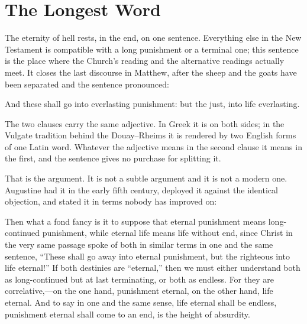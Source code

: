\section{The Longest Word}

The eternity of hell rests, in the end, on one sentence. Everything else in the New Testament is compatible with a long punishment or a terminal one; this sentence is the place where the Church's reading and the alternative readings actually meet. It closes the last discourse in Matthew, after the sheep and the goats have been separated and the sentence pronounced:

\begin{studyframe}
And these shall go into everlasting punishment: but the just, into life everlasting.
\end{studyframe}

The two clauses carry the same adjective. In Greek it is  on both sides; in the Vulgate tradition behind the Douay--Rheims it is rendered by two English forms of one Latin word. Whatever the adjective means in the second clause it means in the first, and the sentence gives no purchase for splitting it.

That is the argument. It is not a subtle argument and it is not a modern one. Augustine had it in the early fifth century, deployed it against the identical objection, and stated it in terms nobody has improved on:

\begin{studyframe}
Then what a fond fancy is it to suppose that eternal punishment means long-continued punishment, while eternal life means life without end, since Christ in the very same passage spoke of both in similar terms in one and the same sentence, ``These shall go away into eternal punishment, but the righteous into life eternal!'' If both destinies are ``eternal,'' then we must either understand both as long-continued but at last terminating, or both as endless. For they are correlative,---on the one hand, punishment eternal, on the other hand, life eternal. And to say in one and the same sense, life eternal shall be endless, punishment eternal shall come to an end, is the height of absurdity.
\end{studyframe}


